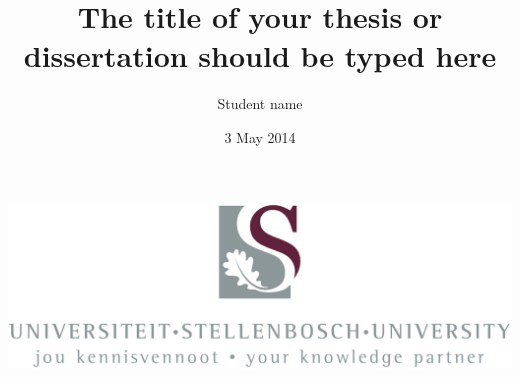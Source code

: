 \documentclass[serif,11pt]{beamer}
\newcommand*{\superscript}[1]{\ensuremath{^{\rm #1}}}
\begin{document}
\title[{\sc The short title of your thesis } \hspace{0.8cm} \insertframenumber/\inserttotalframenumber]{{\sc The title of your thesis or dissertation should be typed here }}
\author[Presentation to some students --- {\sc  May 3\superscript{rd}, 2012}]{{Student name}}
\date{3 May 2014}

\begin{frame}
\begin{center}
\vspace{0.1cm}
\includegraphics[scale=0.25]{USlogo.pdf}
\end{center}
\titlepage
\end{frame}


%
%









\end{document}
